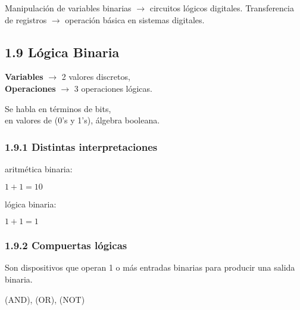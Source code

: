 \documentclass{article}
\begin{document}
Manipulaci\'{o}n de variables binarias $\rightarrow$ circuitos l\'{o}gicos digitales.
\medbreak
Transferencia de registros $\rightarrow$ operaci\'{o}n b\'{a}sica en sistemas digitales.
\medbreak

\subsection*{1.9 L\'{o}gica Binaria}

\begin{center}
    \textbf{Variables} $\rightarrow$ 2 valores discretos, \\
    \textbf{Operaciones} $\rightarrow$ 3 operaciones l\'{o}gicas.
\end{center}
\medbreak

\begin{flushleft}
    Se habla en t\'{e}rminos de bits, \\
    en valores de (0's y 1's), \'{a}lgebra booleana.
\end{flushleft}
\medbreak

\begin{center}
\end{center}

\subsubsection*{1.9.1 Distintas interpretaciones}
\begin{flushleft}
    aritm\'{e}tica binaria: \\
    \begin{center}
        $1 + 1 = 10$
    \end{center}

    l\'{o}gica binaria: \\
    \begin{center}
        $1 + 1 = 1$
    \end{center}
\end{flushleft}

\subsubsection*{1.9.2 Compuertas l\'{o}gicas}
Son dispositivos que operan 1 o m\'{a}s entradas binarias para producir una salida binaria.

\begin{center}
    (AND), (OR), (NOT)
\end{center}
\end{document}

